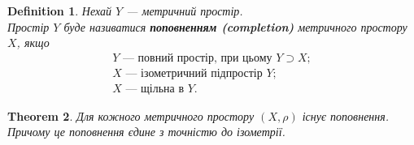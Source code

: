 \documentclass[a4paper, 10pt]{article}
\theoremstyle{theoremdd}
\newtheorem{theorem}{Theorem}[subsection]
\theoremstyle{theoremdd}
\newtheorem{definition}[theorem]{Definition}
\theoremstyle{theoremdd}
\theoremstyle{theoremdd}
\theoremstyle{theoremdd}
\theoremstyle{theoremdd}
\theoremstyle{theoremdd}
\theoremstyle{theoremdd}
\begin{document}
\begin{definition}
Нехай $Y$ --- метричний простір.\\
Простір $Y$ буде називатися \textbf{поповненням (completion)} метричного простору $X$, якщо
\begin{align*}
Y \text{ --- повний простір, при цьому } Y \supset X; \\
X \text{ --- ізометричний підпростір } Y; \\
X \text{ --- щільна в } Y.
\end{align*}
\end{definition}

\begin{theorem}
Для кожного метричного простору $(X,\rho)$ існує поповнення. Причому це поповнення єдине з точністю до ізометрії.
\end{theorem}
\end{document}
